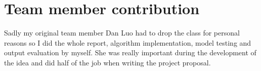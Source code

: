 \section{Team member contribution}
Sadly my original team member Dan Luo had to drop the class for personal reasons so
I did the whole report, algorithm implementation, model testing and output evaluation by myself.
She was really important during the development of the idea and did half of the job
when writing the project proposal.
